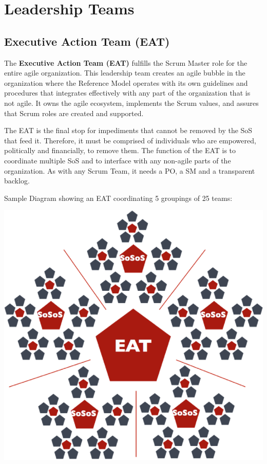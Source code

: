 \documentclass[12pt,a4paper,parskip=full]{scrartcl}
\begin{document}
\section{Leadership Teams}

\subsection{Executive Action Team (EAT)}

The \textbf{Executive Action Team (EAT)} fulfills the Scrum Master role for the entire agile organization. This leadership team creates an agile bubble in the organization where the Reference Model operates with its own guidelines and procedures that integrates effectively with any part of the organization that is not agile. It owns the agile ecosystem, implements the Scrum values, and assures that Scrum roles are created and supported.

The EAT is the final stop for impediments that cannot be removed by the SoS that feed it. Therefore, it must be comprised of individuals who are empowered, politically and financially, to remove them. The function of the EAT is to coordinate multiple SoS and to interface with any non-agile parts of the organization. As with any Scrum Team, it needs a PO, a SM and a transparent backlog.

Sample Diagram showing an EAT coordinating 5 groupings of 25 teams:

\includegraphics[width=\textwidth,height=\textheight,keepaspectratio]{SoS-EAT.png}
\end{document}
